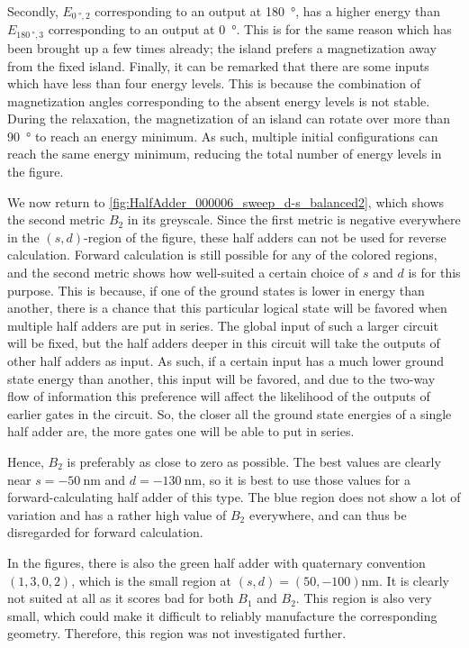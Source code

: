 \documentclass[11pt,a4paper,english]{article}
\begin{document}
Secondly, $E_{\SI{0}{\degree}, 2}$ corresponding to an output at \SI{180}{\degree}, has a higher energy than $E_{\SI{180}{\degree}, 3}$ corresponding to an output at \SI{0}{\degree}. This is for the same reason which has been brought up a few times already; the island prefers a magnetization away from the fixed island.
Finally, it can be remarked that there are some inputs which have less than four energy levels. This is because the combination of magnetization angles corresponding to the absent energy levels is not stable. During the relaxation, the magnetization of an island can rotate over more than \SI{90}{\degree} to reach an energy minimum. As such, multiple initial configurations can reach the same energy minimum, reducing the total number of energy levels in the figure. \par

We now return to \cref{fig:HalfAdder_000006_sweep_d-s_balanced2}, which shows the second metric $B_2$ in its greyscale. Since the first metric is negative everywhere in the $(s,d)$-region of the figure, these half adders can not be used for reverse calculation. Forward calculation is still possible for any of the colored regions, and the second metric shows how well-suited a certain choice of $s$ and $d$ is for this purpose. This is because, if one of the ground states is lower in energy than another, there is a chance that this particular logical state will be favored when multiple half adders are put in series. The global input of such a larger circuit will be fixed, but the half adders deeper in this circuit will take the outputs of other half adders as input. As such, if a certain input has a much lower ground state energy than another, this input will be favored, and due to the two-way flow of information this preference will affect the likelihood of the outputs of earlier gates in the circuit. So, the closer all the ground state energies of a single half adder are, the more gates one will be able to put in series. \par
Hence, $B_2$ is preferably as close to zero as possible. The best values are clearly near $s=\SI{-50}{\nano\metre}$ and $d=\SI{-130}{\nano\metre}$, so it is best to use those values for a forward-calculating half adder of this type. The blue region does not show a lot of variation and has a rather high value of $B_2$ everywhere, and can thus be disregarded for forward calculation.

In the figures, there is also the green half adder with quaternary convention $(1,3,0,2)$, which is the small region at $(s,d) = (50, -100) \si{\nano\metre}$. It is clearly not suited at all as it scores bad for both $B_1$ and $B_2$. This region is also very small, which could make it difficult to reliably manufacture the corresponding geometry. Therefore, this region was not investigated further.
\end{document}
